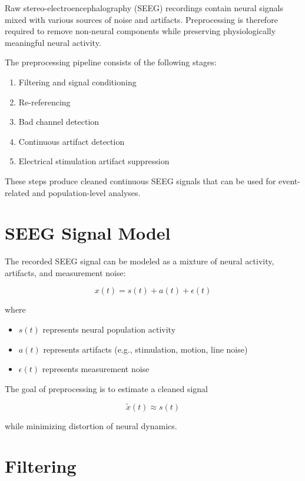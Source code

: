 \documentclass[11pt]{report}
\begin{document}
Raw stereo-electroencephalography (SEEG) recordings contain neural
signals mixed with various sources of noise and artifacts.
Preprocessing is therefore required to remove non-neural components
while preserving physiologically meaningful neural activity.

The preprocessing pipeline consists of the following stages:

\begin{enumerate}
\item Filtering and signal conditioning
\item Re-referencing
\item Bad channel detection
\item Continuous artifact detection
\item Electrical stimulation artifact suppression
\end{enumerate}

These steps produce cleaned continuous SEEG signals that can be used
for event-related and population-level analyses.

\section{SEEG Signal Model}

The recorded SEEG signal can be modeled as a mixture of neural activity,
artifacts, and measurement noise:

\begin{equation}
x(t) = s(t) + a(t) + \epsilon(t)
\end{equation}

where

\begin{itemize}
\item $s(t)$ represents neural population activity
\item $a(t)$ represents artifacts (e.g., stimulation, motion, line noise)
\item $\epsilon(t)$ represents measurement noise
\end{itemize}

The goal of preprocessing is to estimate a cleaned signal

\begin{equation}
\tilde{x}(t) \approx s(t)
\end{equation}

while minimizing distortion of neural dynamics.

\section{Filtering}
\end{document}

